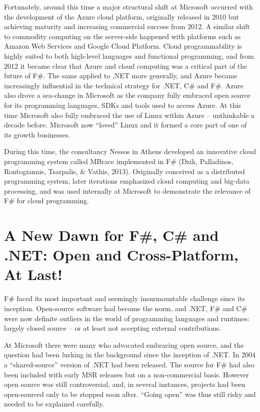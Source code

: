 \documentclass[acmsmall]{acmart}\settopmatter{}
\begin{document}
Fortunately, around this time a major structural shift at Microsoft occurred with the development of the Azure cloud platform,
originally released in 2010 but achieving maturity and increasing commercial success from 2012.  A similar shift to commodity
computing on the server-side happened with platforms such as Amazon Web Services and Google Cloud Platform.   Cloud
programmability is highly suited to both high-level languages and functional programming, and from 2012 it became clear that
Azure and cloud computing was a critical part of the future of F\#. The same applied to .NET more generally, and Azure
became increasingly influential in the technical strategy for .NET, C\# and F\#.  Azure also drove a sea-change in Microsoft
as the company fully embraced open source for its programming languages, SDKs and tools used to access Azure. At this
time Microsoft also fully embraced the use of Linux within Azure – unthinkable a decade before.  Microsoft now “loved” Linux
and it formed a core part of one of its growth businesses.

During this time, the consultancy Nessos in Athens developed an innovative cloud programming system called MBrace
implemented in F\# (Dzik, Palladinos, Rontogiannis, Tsarpalis, \& Vathis, 2013). Originally conceived as a distributed
programming system, later iterations emphasized cloud computing and big-data processing, and was used internally at
Microsoft to demonstrate the relevance of F\# for cloud programming. 


\section*{A New Dawn for F\#, C\# and .NET: Open and Cross-Platform, At Last!}

F\# faced its most important and seemingly insurmountable challenge since its inception. Open-source software had
become the norm, and .NET, F\# and C\# were now definite outliers in the world of programming languages and
runtimes: largely closed source – or at least not accepting external contributions.  

At Microsoft there were many who advocated embracing open source, and the question had been lurking in the
background since the inception of .NET. In 2004 a “shared-source” version of .NET had been released. The source
for F\# had also been included with early MSR releases but on a non-commercial basis. However open source was
still controversial, and, in several instances, projects had been open-sourced only to be stopped soon
after.  “Going open” was thus still risky and needed to be explained carefully. 
\end{document}
